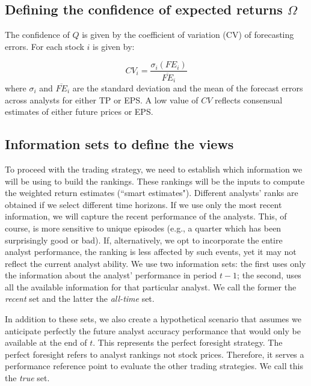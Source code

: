 \documentclass{article}\usepackage[]{graphicx}\usepackage[]{color}
\newcommand{\tr}{\textit{true}}
\newcommand{\naive}{\textit{recent}}
\newcommand{\default}{\textit{all-time}}
\begin{document}
\subsection{Defining the confidence of expected returns $\Omega$}
\label{def-omega}
The confidence of $Q$ is given by the coefficient of variation (CV) of forecasting errors. For each stock $i$ is given by:

\begin{equation}
\label{eq-cv}
CV_{i} = \frac{\sigma_i (FE_{i})}{\overline{FE}_{i}}
\end{equation}
where $\sigma_i$ and $\overline{FE}_i$ are the standard deviation and the mean of the forecast errors across analysts for either TP or EPS. A low value of $CV$ reflects consensual estimates of either future prices or EPS.



\subsection{Information sets to define the views}
\label{inf-set}
To proceed with the trading strategy, we need to establish which information we  will be using to build the rankings. These rankings will be the inputs to compute the weighted return estimates (``smart estimates"). Different analysts' ranks are obtained  if we select different time horizons. If we use only the most  recent information, we will capture the recent performance of the analysts. This, of course, is more sensitive to unique episodes (e.g., a quarter which has been surprisingly good or bad). If, alternatively, we opt to incorporate the entire analyst performance, the ranking is less affected by such events, yet it may not reflect the current analyst ability. We use two information sets: the first uses only the  information about the analyst' performance in period $t-1$; the second, uses all the available  information for that particular analyst. We call the former the \naive{} set and the latter the \default{} set. 

In addition to these sets,  we also create a hypothetical scenario that assumes we anticipate perfectly the future analyst accuracy performance  that would only be available at the end of $t$.  This represents the perfect foresight strategy. The perfect foresight refers to analyst rankings not stock prices. Therefore, it serves a performance reference point to evaluate the other trading strategies. We call this the \tr{} set. 
\end{document}
